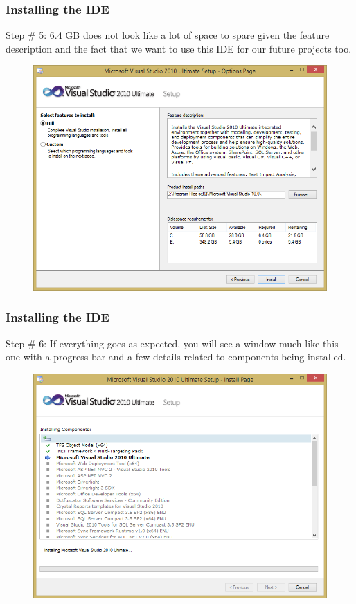 \documentclass{beamer}
\begin{document}
\begin{frame}
    \frametitle{Installing the IDE}
    Step \# 5: 6.4 GB does not look like a lot of space to spare given the feature description and the fact that we want to use this IDE for our future projects too.
    \begin{figure}
        \centering
        \includegraphics[scale=0.39]{step_4}
    \end{figure}
\end{frame}

\begin{frame}
    \frametitle{Installing the IDE}
    Step \# 6: If everything goes as expected, you will see a window much like this one with a progress bar and a few details related to components being installed.
    \begin{figure}
        \centering
        \includegraphics[scale=0.39]{step_5}
    \end{figure}
\end{frame}
\end{document}
